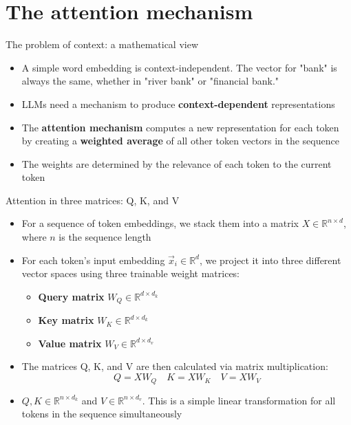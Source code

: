 \documentclass[aspectratio=169]{beamer}\usepackage[]{graphicx}\usepackage[]{xcolor}
\makeatletter
\newcommand{\defword}[1]{\textbf{\textcolor{beamer@blendedblue}{#1}}}
\makeatother
\begin{document}
\section{The attention mechanism}

\begin{frame}{The problem of context: a mathematical view}
\begin{itemize}
\item A simple word embedding is context-independent. The vector for "bank" is always the same, whether in "river bank" or "financial bank."
\vfill
\item LLMs need a mechanism to produce \defword{context-dependent} representations
\vfill
\item The \defword{attention mechanism} computes a new representation for each token by creating a \textbf{weighted average} of all other token vectors in the sequence
\vfill
\item The weights are determined by the relevance of each token to the current token
\end{itemize}
\end{frame}

\begin{frame}{Attention in three matrices: Q, K, and V}
\begin{itemize}
\item For a sequence of token embeddings, we stack them into a matrix $X \in \mathbb{R}^{n \times d}$, where $n$ is the sequence length
\vfill
\item For each token's input embedding $\vec{x}_i \in \mathbb{R}^d$, we project it into three different vector spaces using three trainable weight matrices:
  \begin{itemize}
    \item \defword{Query matrix} $W_Q \in \mathbb{R}^{d \times d_k}$
    \vfill
    \item \defword{Key matrix} $W_K \in \mathbb{R}^{d \times d_k}$
    \vfill
    \item \defword{Value matrix} $W_V \in \mathbb{R}^{d \times d_v}$
  \end{itemize}
\vfill
\item The matrices Q, K, and V are then calculated via matrix multiplication:
  $$ Q = X W_Q \quad K = X W_K \quad V = X W_V $$
\vfill
\item $Q, K \in \mathbb{R}^{n \times d_k}$ and $V \in \mathbb{R}^{n \times d_v}$. This is a simple linear transformation for all tokens in the sequence simultaneously
\end{itemize}
\end{frame}
\end{document}
